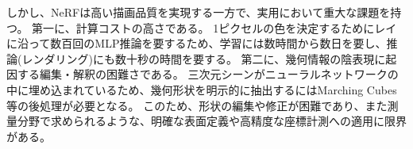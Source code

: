 しかし、NeRFは高い描画品質を実現する一方で、実用において重大な課題を持つ。
第一に、計算コストの高さである。
1ピクセルの色を決定するためにレイに沿って数百回のMLP推論を要するため、学習には数時間から数日を要し、推論(レンダリング)にも数十秒の時間を要する。
第二に、幾何情報の陰表現に起因する編集・解釈の困難さである。
三次元シーンがニューラルネットワークの中に埋め込まれているため、幾何形状を明示的に抽出するにはMarching Cubes\cite{Lorensen1987SIGGRAPH_MarchingCubes}等の後処理が必要となる。
このため、形状の編集や修正が困難であり、また測量分野で求められるような、明確な表面定義や高精度な座標計測への適用に限界がある。

